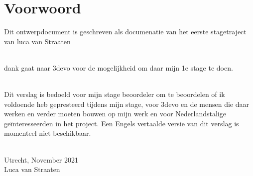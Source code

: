 \chapter*{Voorwoord}

Dit ontwerpdocument is geschreven als documenatie van het eerste stagetraject
van luca van Straaten\\\

dank gaat naar 3devo voor de mogelijkheid om daar mijn 1e stage te doen.\\\

Dit verslag is bedoeld voor mijn stage beoordeler om te beoordelen of ik voldoende heb gepresteerd tijdens mijn stage, voor 3devo en de mensen die daar werken en verder moeten bouwen op mijn werk en voor Nederlandstalige geïnteresseerden in het project. Een Engels vertaalde versie van dit verslag is momenteel niet beschikbaar.\\\


Utrecht, November 2021\\Luca van Straaten
